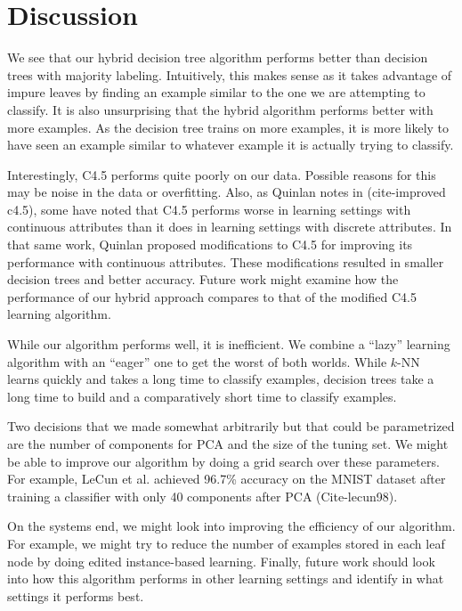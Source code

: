 \section{Discussion}

We see that our hybrid decision tree algorithm performs better than decision trees with majority labeling. Intuitively, this makes sense as it takes advantage of impure leaves by finding an example similar to the one we are attempting to classify. It is also unsurprising that the hybrid algorithm performs better with more examples. As the decision tree trains on more examples, it is more likely to have seen an example similar to whatever example it is actually trying to classify.

Interestingly, C4.5 performs quite poorly on our data. Possible reasons for this may be noise in the data or overfitting. Also, as Quinlan notes in (cite-improved c4.5), some have noted that C4.5 performs worse in learning settings with continuous attributes than it does in learning settings with discrete attributes. In that same work, Quinlan proposed modifications to C4.5 for improving its performance with continuous attributes. These modifications resulted in smaller decision trees and better accuracy. Future work might examine how the performance of our hybrid approach compares to that of the modified C4.5 learning algorithm.

While our algorithm performs well, it is inefficient. We combine a ``lazy'' learning algorithm with an ``eager'' one to get the worst of both worlds. While $k$-NN learns quickly and takes a long time to classify examples, decision trees take a long time to build and a comparatively short time to classify examples.

Two decisions that we made somewhat arbitrarily but that could be parametrized are the number of components for PCA and the size of the tuning set. We might be able to improve our algorithm by doing a grid search over these parameters. For example, LeCun et al. achieved 96.7\% accuracy on the MNIST dataset after training a classifier with only 40 components after PCA (Cite-lecun98).

On the systems end, we might look into improving the efficiency of our algorithm. For example, we might try to reduce the number of examples stored in each leaf node by doing edited instance-based learning.
Finally, future work should look into how this algorithm performs in other learning settings and identify in what settings it performs best.
